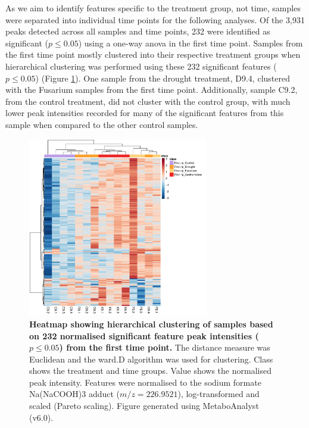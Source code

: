 As we aim to identify features specific to the treatment group, not time, samples were separated into individual time points for the following analyses. Of the 3,931 peaks detected across all samples and time points, 232 were identified as significant ($p \le0.05$) using a one-way \ac{anova} in the first time point. Samples from the first time point mostly clustered into their respective treatment groups when hierarchical clustering was performed using these 232 significant features ($p \le0.05$) (Figure \ref{fig:Sig232FeaturesRedSamples}). One sample from the drought treatment, D9.4, clustered with the Fusarium samples from the first time point. Additionally, sample C9.2, from the control treatment, did not cluster with the control group, with much lower peak intensities recorded for many of the significant features from this sample when compared to the other control samples.  

\begin{figure}[h!]
    \centering
    \includegraphics[width=0.7\textwidth]{Figures/Sig232Features_heatmap_9_dpi72-ForThesis.pdf}
    \caption[Heatmap showing hierarchical clustering of samples based on 232 normalised significant feature peak intensities ($p \le0.05$) from the first time point.]{\textbf{Heatmap showing hierarchical clustering of samples based on 232 normalised significant feature peak intensities ($p \le0.05$) from the first time point.} The distance measure was Euclidean and the ward.D algorithm was used for clustering. Class shows the treatment and time groups. Value shows the normalised peak intensity. Features were normalised to the sodium formate Na(NaCOOH)3 adduct ($m/z=226.9521$), log-transformed and scaled (Pareto scaling). Figure generated using MetaboAnalyst (v6.0).}
    \label{fig:Sig232FeaturesRedSamples}
\end{figure}

